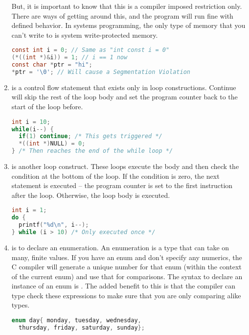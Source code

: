 \begin{enumerate}
	      But, it is important to know that this is a compiler imposed restriction only.
        There are ways of getting around this, and the program will run fine with defined behavior.
        In systems programming, the only type of memory that you can't write to is system write-protected memory.

\begin{lstlisting}[language=C]
const int i = 0; // Same as "int const i = 0"
(*((int *)&i)) = 1; // i == 1 now
const char *ptr = "hi";
*ptr = '\0'; // Will cause a Segmentation Violation
\end{lstlisting}

	    \item {} is a control flow statement that exists only in loop constructions.
        Continue will skip the rest of the loop body and set the program counter back to the start of the loop before.

\begin{lstlisting}[language=C]
int i = 10;
while(i--) {
  if(1) continue; /* This gets triggered */
  *((int *)NULL) = 0;
} /* Then reaches the end of the while loop */
\end{lstlisting}

	    \item {} is another loop construct.
        These loops execute the body and then check the condition at the bottom of the loop.
        If the condition is zero, the next statement is executed -- the program counter is set to the first instruction after the loop.
        Otherwise, the loop body is executed.

\begin{lstlisting}[language=C]
int i = 1;
do {
  printf("%d\n", i--);
} while (i > 10) /* Only executed once */
\end{lstlisting}

	    \item {} is to declare an enumeration.
        An enumeration is a type that can take on many, finite values.
        If you have an enum and don't specify any numerics, the C compiler will generate a unique number for that enum (within the context of the current enum) and use that for comparisons.
        The syntax to declare an instance of an enum is .
        The added benefit to this is that the compiler can type check these expressions to make sure that you are only comparing alike types.

\begin{lstlisting}[language=C]
enum day{ monday, tuesday, wednesday,
  thursday, friday, saturday, sunday};


\end{lstlisting}
\end{enumerate}
